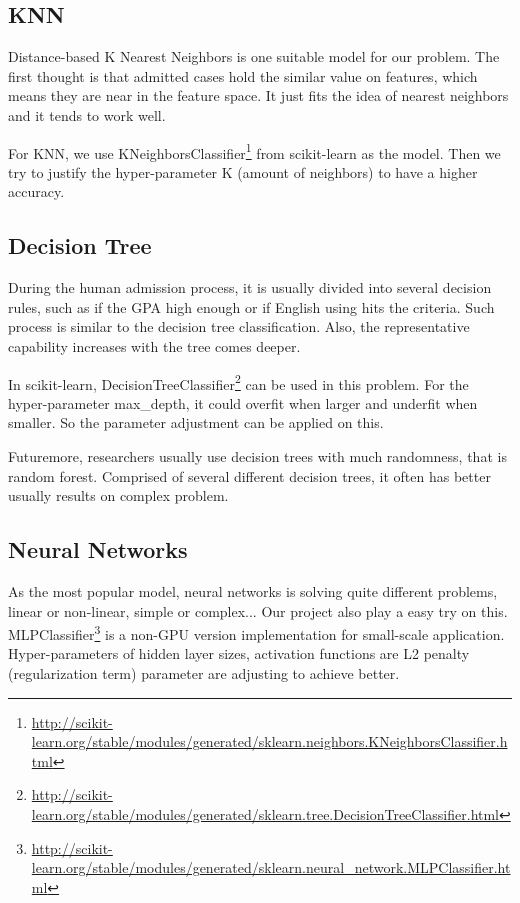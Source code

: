 \documentclass{article}
\begin{document}
\subsection{KNN}

Distance-based K Nearest Neighbors is one suitable model for our problem. The first thought is that admitted cases hold the similar value on features, which means they are near in the feature space. It just fits the idea of nearest neighbors and it tends to work well.

For KNN, we use KNeighborsClassifier\footnote{\url{http://scikit-learn.org/stable/modules/generated/sklearn.neighbors.KNeighborsClassifier.html}} from scikit-learn as the model. Then we try to justify the hyper-parameter K (amount of neighbors) to have a higher accuracy.

\subsection{Decision Tree}

During the human admission process, it is usually divided into several decision rules, such as if the GPA high enough or if English using hits the criteria. Such process is similar to the decision tree classification. Also, the representative capability increases with the tree comes deeper.

In scikit-learn, DecisionTreeClassifier\footnote{\url{http://scikit-learn.org/stable/modules/generated/sklearn.tree.DecisionTreeClassifier.html}} can be used in this problem. For the hyper-parameter max\_depth, it could overfit when larger and underfit when smaller. So the parameter adjustment can be applied on this.

Futuremore, researchers usually use decision trees with much randomness, that is random forest. Comprised of several different decision trees, it often has better usually results on complex problem.

\subsection{Neural Networks}

As the most popular model, neural networks is solving quite different problems, linear or non-linear, simple or complex... Our project also play a easy try on this. MLPClassifier\footnote{\url{http://scikit-learn.org/stable/modules/generated/sklearn.neural_network.MLPClassifier.html}} is a non-GPU version implementation for small-scale application. Hyper-parameters of hidden layer sizes, activation functions are L2 penalty (regularization term) parameter are adjusting to achieve better.
\end{document}
